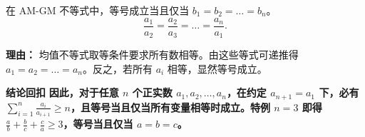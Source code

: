 \begin{proofbox}
\begin{description}[style=nextline, leftmargin=2.8em, labelsep=0.5em, itemsep=0.55em]
    \item[\textbf{步骤六（分析取等）：}] 在 AM-GM 不等式中，等号成立当且仅当 $b_1 = b_2 = \dots = b_n$。
    \[
    \frac{a_1}{a_2} = \frac{a_2}{a_3} = \dots = \frac{a_n}{a_1}.
    \]
    \par\textbf{理由：} 均值不等式取等条件要求所有数相等。由这些等式可递推得 $a_1 = a_2 = \dots = a_n$。反之，若所有 $a_i$ 相等，显然等号成立。
\end{description}

\medskip
\textbf{\textcolor{CProof}{结论回扣}}
\textbf{因此，对于任意 $n$ 个正实数 $a_1, a_2, \dots, a_n$，在约定 $a_{n+1}=a_1$ 下，必有 $\sum_{i=1}^{n} \frac{a_i}{a_{i+1}} \ge n$，且等号当且仅当所有变量相等时成立。特例 $n=3$ 即得 $\frac{a}{b}+\frac{b}{c}+\frac{c}{a} \ge 3$，等号当且仅当 $a=b=c$。}
\end{proofbox}
